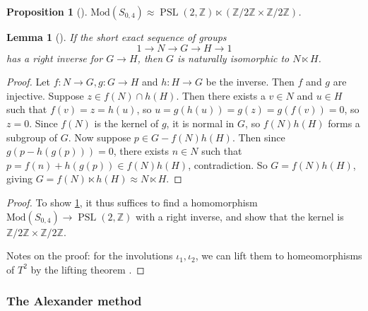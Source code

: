 \documentclass[reqno]{amsart}
\newtheorem{lemma}[theorem]{Lemma}
\newtheorem{proposition}[theorem]{Proposition}
\theoremstyle{definition}
\theoremstyle{remark}
\DeclareMathOperator{\PSL}{PSL}
\newcommand{\Mod}{{\mathrm{Mod}}}
\begin{document}
\begin{proposition}[]\label{mcg-of-4-punctured-sphere}
    $\Mod \left( S_{0,4} \right) \approx
    \PSL \left( 2, \mathbb{Z} \right) \ltimes
    \left( \mathbb{Z}/ 2 \mathbb{Z} \times 
    \mathbb{Z} / 2 \mathbb{Z} \right) $.
\end{proposition}


\begin{lemma}[]
    If the short exact sequence of groups
    \[
    1 \to N \to G \to H \to 1
    \] 
    has a right inverse for $G \to H$, then
    $G$ is naturally isomorphic to
    $N \ltimes H$.
\end{lemma}

\begin{proof}
    Let $f \colon N \to G, g \colon G \to H$ and
    $h \colon H \to G$ be the inverse. Then
    $f$ and $g$ are injective. Suppose
    $z \in f(N) \cap h(H)$. Then there exists a
    $v \in N$ and $u \in H$ such that
    $f(v) = z = h(u)$, so 
    $u = g\left( h(u) \right) = g(z)
    = g(f(v)) = 0$, so $z = 0$.
    Since $f(N)$ is the kernel of $g$, it is
    normal in $G$, so $f(N) h(H)$ forms
    a subgroup of $G$. Now suppose
    $p \in G - f(N)h(H)$. Then since
    $g\left( p - h(g(p)) \right) = 0$, there
    exists $n \in N$ such that
    $p = f(n) + h(g(p)) \in f(N) h(H)$, contradiction.
    So $G = f(N) h(H)$, giving $G = f(N) \ltimes h(H)
    \approx N \ltimes H$.
\end{proof}

\begin{proof}
    To show \ref{mcg-of-4-punctured-sphere}, it
    thus suffices to find a homomorphism
    $\Mod \left( S_{0,4} \right) \to 
    \PSL \left( 2, \mathbb{Z} \right) $ with a right
    inverse, and show that the kernel
    is $\mathbb{Z} /2 \mathbb{Z} \times \mathbb{Z} / 2 \mathbb{Z}$.

    Notes on the proof: for the involutions
    $\iota_1, \iota_2$, we can lift them
    to homeomorphisms of $T^2$ by the lifting theorem
    \cite[Thm~4.1]{Bredon}. 
\end{proof}


\subsubsection{The Alexander method}
\end{document}
